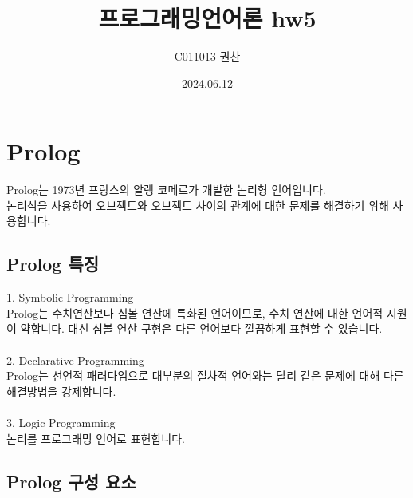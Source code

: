 \documentclass{article}
\title{프로그래밍언어론 hw5}
\author{C011013 권찬}
\date{2024.06.12}
\begin{document}
\maketitle

\section{Prolog}
\quad Prolog는 1973년 프랑스의 알랭 코메르가 개발한 논리형 언어입니다.\\
논리식을 사용하여 오브젝트와 오브젝트 사이의 관계에 대한 문제를 해결하기 위해 사용합니다.\\

\subsection{Prolog 특징}
1. Symbolic Programming\\
\quad Prolog는 수치연산보다 심볼 연산에 특화된 언어이므로, 수치 연산에 대한 언어적 지원이 약합니다. 대신 심볼 연산 구현은 다른 언어보다 깔끔하게 표현할 수 있습니다.\\\\
2. Declarative Programming\\
\quad Prolog는 선언적 패러다임으로 대부분의 절차적 언어와는 달리 같은 문제에 대해 다른 해결방법을 강제합니다.\\\\
3. Logic Programming\\
\quad 논리를 프로그래밍 언어로 표현합니다.

\subsection{Prolog 구성 요소}
\end{document}
